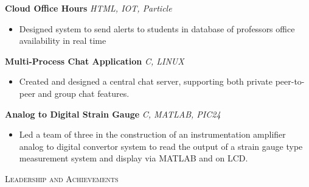 \documentclass[a4paper]{article}
\newcommand{\lineunder} {
	\vspace*{-8pt} \\
	\hspace*{-18pt} \hrulefill \\
}
\newcommand{\header} [1] {
	{\hspace*{-18pt}\vspace*{6pt} \textsc{#1}}
	\vspace*{-6pt} \lineunder
}
\begin{document}
	{\textbf{Cloud Office Hours}} {\sl HTML, IOT, Particle} \\
	\vspace*{-1mm}
	\begin{itemize} \itemsep 1pt
		\item Designed system to send alerts to students in database of professors office availability in real time
	\end{itemize}
	\vspace*{-1mm}
	
	{\textbf{Multi-Process Chat Application}} {\sl C, LINUX} \\
	\vspace*{-1mm}
	\begin{itemize} \itemsep 1pt
		\item Created and designed a central chat server, supporting both private peer-to-peer and group chat features.
	\end{itemize}
	\vspace*{-1mm}
	
	{\textbf{Analog to Digital Strain Gauge}} {\sl C, MATLAB, PIC24} \\
	\vspace*{-1mm}
	\begin{itemize} \itemsep 1pt
		\item Led a team of three in the construction of an instrumentation amplifier analog to digital convertor system to read the output of a strain gauge type measurement system and display via MATLAB and on LCD. 
	\end{itemize}
	\vspace*{2mm}

	\header{\large \scshape {Leadership and Achievements}}
	\vspace{1mm}
	
\end{document}
